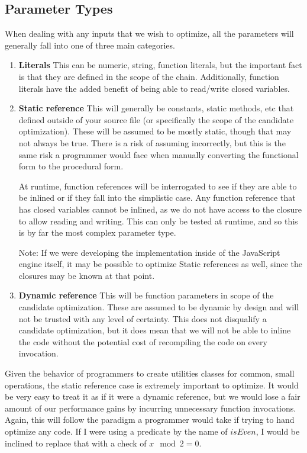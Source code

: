 \subsection{Parameter Types}
When dealing with any inputs that we wish to optimize, all the parameters will generally fall into one of three main categories.

\begin{enumerate}
  \item \textbf{Literals}
    This can be numeric, string, function literals, but the important fact is that they are defined in the scope of the chain.  Additionally, function literals have the added benefit of being able to read/write closed variables.

  \item \textbf{Static reference}
    This will generally be constants, static methods, etc that defined outside of your source file (or specifically the scope of the candidate optimization).  These will be assumed to be mostly static, though that may not always be true.  There is a risk of assuming incorrectly, but this is the same risk a programmer would face when manually converting the functional form to the procedural form.  
    
    At runtime, function references will be interrogated to see if they are able to be inlined or if they fall into the simplistic case.  Any function reference that has closed variables cannot be inlined, as we do not have access to the closure to allow reading and writing.  This can only be tested at runtime, and so this is by far the most complex parameter type.  
    
    Note: If we were developing the implementation inside of the JavaScript engine itself, it may be possible to optimize Static references as well, since the closures may be known at that point.

  \item \textbf{Dynamic reference}
    This will be function parameters in scope of the candidate optimization. These are assumed to be dynamic by design and will not be trusted with any level of certainty.  This does not disqualify a candidate optimization, but it does mean that we will not be able to inline the code without the potential cost of recompiling the code on every invocation.
\end{enumerate}

Given the behavior of programmers to create utilities classes for common, small operations, the static reference case is extremely important to optimize.  It would be very easy to treat it as if it were a dynamic reference, but we would lose a fair amount of our performance gains by incurring unnecessary function invocations.  Again, this will follow the paradigm a programmer would take if trying to hand optimize any code.  If I were using a predicate by the name of $isEven$, I would be inclined to replace that with a check of $x \mod 2 = 0$. 